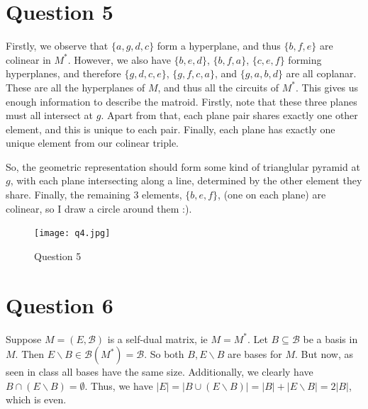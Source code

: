 \documentclass{article}
\begin{document}
\section*{Question 5}
Firstly, we observe that $\{a, g, d, c\}$ form a hyperplane, and thus 
$\{b, f, e\}$ are colinear in $M^*$. However, 
we also have $\{b, e, d\}$, $\{b, f, a\}$, $\{c, e, f\}$ forming hyperplanes,
and therefore $\{g, d, c, e\}$, $\{g, f, c, a\}$, and $\{g, a, b, d\}$
are all coplanar. These are all the hyperplanes of $M$, and thus all the circuits of 
$M^*$. This gives us enough information to describe the matroid.
Firstly, note that these three planes must all intersect at $g$.
Apart from that, each plane pair shares exactly one other element,
and this is unique to each pair. Finally, each plane has exactly one unique element 
from our colinear triple.

So, the geometric representation should form some kind of trianglular pyramid 
at $g$, with each plane intersecting along a line, determined by the other element they share.
Finally, the remaining 3 elements, $\{b, e, f\}$, (one on each plane) are colinear,
so I draw a circle around them :).
\begin{figure}[!htb]
    \centering
    \texttt{[image: q4.jpg]}
    \caption{Question 5}
\end{figure}
\section*{Question 6}
Suppose $M=(E, \mathcal{B})$ is a self-dual matrix, ie $M=M^*$.
Let $B\subseteq \mathcal{B}$ be a basis in $M$. Then $E\backslash B\in \mathcal{B}(M^*)=\mathcal{B}$.
So both $B, E\backslash B$ are bases for $M$. But now, as seen in class all bases have the same size.
Additionally, we clearly have $B\cap (E\backslash B)=\emptyset$.
Thus, we have $|E|=|B\cup (E\backslash B)|=|B|+ |E\backslash B|=2|B|$, which is even.
\end{document}
